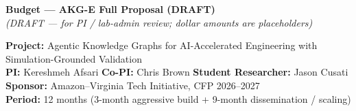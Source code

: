 \documentclass[10pt]{article}
\begin{document}
\begin{center}
{\large\bfseries Budget --- AKG-E Full Proposal (DRAFT)} \\[2pt]
\small\itshape (DRAFT --- for PI / lab-admin review; dollar amounts are placeholders)
\end{center}

\vspace{0.4em}

\noindent\textbf{Project:} Agentic Knowledge Graphs for AI-Accelerated Engineering with Simulation-Grounded Validation \\
\textbf{PI:} Kereshmeh Afsari \quad \textbf{Co-PI:} Chris Brown \quad \textbf{Student Researcher:} Jason Cusati \\
\textbf{Sponsor:} Amazon--Virginia Tech Initiative, CFP 2026--2027 \\
\textbf{Period:} 12 months (3-month aggressive build + 9-month dissemination / scaling)

\vspace{0.6em}
\end{document}
